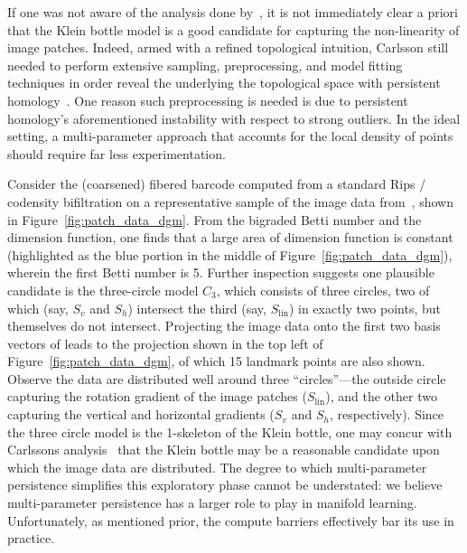 \documentclass[sn-mathphys]{sn-jnl}
\begin{document}
If one was not aware of the analysis done by~\cite{lee2003nonlinear, hateren_schaaf_1998, carlsson2008local, perea2014klein}, it is not immediately clear a priori that the Klein bottle model is  a good candidate for capturing the non-linearity of image patches. 
Indeed, armed with a refined topological intuition, Carlsson still needed to perform extensive sampling, preprocessing, and model fitting techniques in order reveal the underlying the topological space with persistent homology~\cite{carlsson2008local}.
One reason such preprocessing is needed is due to persistent homology's aforementioned instability with respect to strong outliers. 
In the ideal setting, a multi-parameter approach that accounts for the local density of points should require far less experimentation. 
 
Consider the (coarsened) fibered barcode computed from a standard Rips / codensity bifiltration on a representative sample of the image data from~\cite{hateren_schaaf_1998}, shown in Figure~\ref{fig:patch_data_dgm}. 
From the bigraded Betti number and the dimension function, one finds that a large area of dimension function is constant (highlighted as the blue portion in the middle of Figure~\ref{fig:patch_data_dgm}), wherein the first Betti number is 5. Further inspection suggests one plausible candidate is the three-circle model $C_3$, which consists of three circles, two of which (say, $S_v$ and $S_h$) intersect the third (say, $S_\mathrm{lin}$) in exactly two points, but themselves do not intersect. 
Projecting the image data onto the first two basis vectors of leads to the projection shown in the top left of Figure~\ref{fig:patch_data_dgm}, of which 15 landmark points are also shown. Observe the data are distributed well around three ``circles''---the outside circle capturing the rotation gradient of the image patches ($S_{\mathrm{lin}}$), and the other two capturing the vertical and horizontal gradients ($S_v$ and $S_h$, respectively). Since the three circle model is the 1-skeleton of the Klein bottle, one may concur with Carlssons analysis~\cite{carlsson2008local} that the Klein bottle may be a reasonable candidate upon which the image data are distributed. 
The degree to which multi-parameter persistence simplifies this exploratory phase cannot be understated: we believe multi-parameter persistence has a larger role to play in manifold learning. 
Unfortunately, as mentioned prior, the compute barriers effectively bar its use in practice. 
\end{document}
